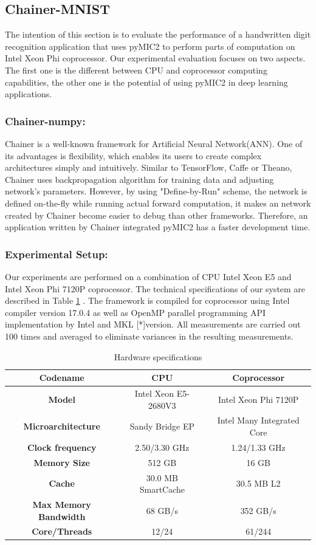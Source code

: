 \subsection{Chainer-MNIST}
%
The intention of this section is to evaluate the performance of a handwritten digit recognition application that uses pyMIC2 to perform parts of computation on Intel Xeon Phi coprocessor. Our experimental evaluation focuses on two aspects. The first one is the different between CPU and coprocessor computing capabilities, the other one is the potential of using pyMIC2 in deep learning applications.
\subsubsection{Chainer-numpy:}
%
Chainer is a well-known framework for Artificial Neural Network(ANN). One of its advantages is flexibility, which enables its users to create complex architectures simply and intuitively. Similar to TensorFlow, Caffe or Theano, Chainer uses backpropagation algorithm \cite{backprop} for training data and adjusting network's parameters. However, by using "Define-by-Run" scheme,  the network is defined on-the-fly while running actual forward computation, it makes an network created by Chainer become easier to debug than other frameworks. Therefore, an application written by Chainer integrated pyMIC2 has a faster development time.
%

\subsubsection{Experimental Setup:}
%

Our experiments are performed on a combination of CPU Intel Xeon E5 and Intel Xeon Phi 7120P coprocessor. The technical specifications of our system are described in Table \ref{tab:sys-spec} . The framework is compiled for coprocessor using Intel compiler version 17.0.4 as well as OpenMP parallel programming API implementation by Intel  and MKL [*]version. All measurements are carried out 100 times and averaged to eliminate variances in the resulting measurements.
%
\begin{table}[]
\centering
\caption{Hardware specifications}
\label{tab:sys-spec}
\begin{tabular}{|c|c|c|}
\hline
\textbf{Codename} 	& \textbf{CPU} 	& \textbf{Coprocessor} \\ \hline
\textbf{Model} & Intel Xeon E5-2680V3  & Intel Xeon Phi 7120P \\
\textbf{Microarchitecture} & Sandy Bridge EP & Intel Many Integrated Core \\
\textbf{Clock frequency} & 2.50/3.30 GHz & 1.24/1.33 GHz \\
\textbf{Memory Size} & 512 GB & 16 GB \\
\textbf{Cache} & 30.0 MB SmartCache & 30.5 MB L2 \\
\textbf{Max Memory Bandwidth} & 68 GB/s & 352 GB/s\\
\textbf{Core/Threads} & 12/24 & 61/244 \\
\hline
\end{tabular} 
\end{table}


